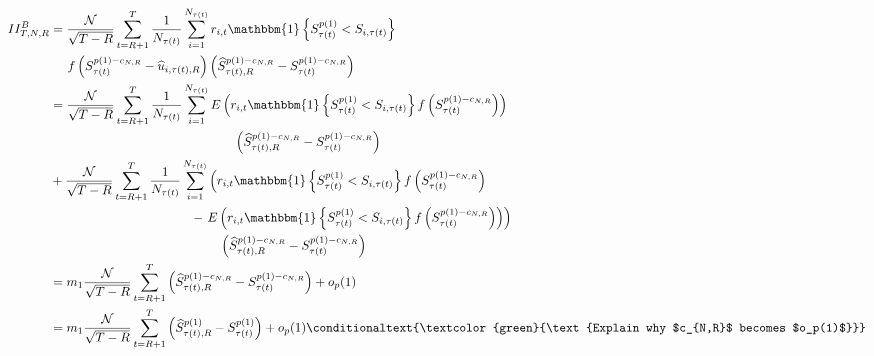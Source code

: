 \begin{align}
II^B_{T,N,R} &= \frac{\mathcal{N}}{\sqrt{T-R}}\sum_{t=R+1}^{T}\frac{1}{N_{\tau(t)}}\sum_{i=1}^{N_{\tau(t)}} r_{i,t} \mathbbm{1} \left\{ S_{\tau(t)}^{p(1)} < S_{i,\tau(t) } \right\} \\
& \hspace{0.5cm} f\left( S_{\tau(t) }^{p(1)-c_{N,R}} - \widehat{u}_{i,\tau(t),R} \right) \left( \widehat{S}_{\tau(t),R}^{p(1)-c_{N,R}} -S_{\tau(t)}^{p(1)-c_{N,R}}\right) \notag \\
&= \frac{\mathcal{N}}{\sqrt{T-R}}\sum_{t=R+1}^{T}\frac{1}{N_{\tau(t)}}\sum_{i=1}^{N_{\tau(t)}} E\left( r_{i,t} \mathbbm{1} \left\{ S_{\tau(t)}^{p(1)} < S_{i,\tau(t) } \right\} f\left( S_{\tau(t) }^{p(1)-c_{N,R}}\right) \right) \notag \\
&\hspace{5.1cm} \left( \widehat{S}_{\tau(t),R}^{p(1)-c_{N,R}} -S_{\tau(t)}^{p(1)-c_{N,R}}\right) \notag \\
&+ \frac{\mathcal{N}}{\sqrt{T-R}}\sum_{t=R+1}^{T}\frac{1}{N_{\tau(t)}}\sum_{i=1}^{N_{\tau(t)}} \left( r_{i,t} \mathbbm{1} \left\{ S_{\tau(t)}^{p(1)} < S_{i,\tau(t) } \right\} f\left( S_{\tau(t) }^{p(1)-c_{N,R}}\right) \right. \notag \\
&\hspace{3.9cm}- \left. E\left( r_{i,t} \mathbbm{1} \left\{ S_{\tau(t)}^{p(1)} < S_{i,\tau(t) } \right\} f\left( S_{\tau(t) }^{p(1)-c_{N,R}}\right) \right) \right) \notag \\
&\hspace{4.7cm} \left( \widehat{S}_{\tau(t),R}^{p(1)-c_{N,R}} -S_{\tau(t)}^{p(1)-c_{N,R}}\right) \notag \\
&= m_{1}\frac{\mathcal{N}}{\sqrt{T-R}}\sum_{t=R+1}^{T} \left( \widehat{S}_{\tau(t),R}^{p(1)-c_{N,R}}-S_{\tau(t) }^{p(1)-c_{N,R}}\right) +o_{p}(1) \notag \\
&= m_{1}\frac{\mathcal{N}}{\sqrt{T-R}}\sum_{t=R+1}^{T} \left( \widehat{S}_{\tau(t),R}^{p(1)}-S_{\tau(t) }^{p(1)}\right) + o_{p}(1) \conditionaltext{\textcolor{green}{\text{Explain why $c_{N,R}$ becomes $o_p(1)$}}} \notag 
\end{align} 
